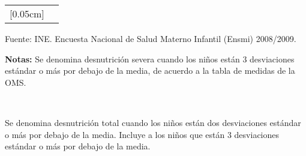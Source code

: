 {\begin{center}
\begin{tabular}{x{4.0cm}c}
			[0.05cm]
			\hline
			&\\[-0.36cm]\end{tabular}\addtocounter{Cuadro}{1}
	\end{center}
	{\footnotesize Fuente:  INE. Encuesta Nacional de Salud Materno Infantil (Ensmi) 2008/2009.}\\[.1cm]
	{\parbox{13cm}{\footnotesize \textbf{Notas:} Se denomina desnutrición severa cuando los niños están 3 desviaciones estándar o más por debajo de la media, de acuerdo a la tabla de medidas de la OMS. }}\\[.3cm]
	{\parbox{13cm}{\footnotesize Se denomina desnutrición total cuando los niños están dos desviaciones estándar o más por debajo de la media. Incluye a los niños que están 3 desviaciones estándar o más por debajo de la media.}}\\
}



